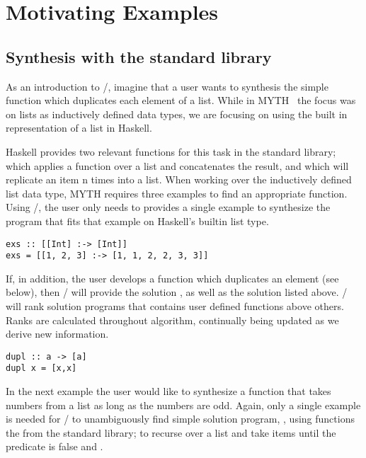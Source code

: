 \section{Motivating Examples} 
\label{examples}

\subsection{Synthesis with the standard library}

As an introduction to \ourTool/, imagine that a user wants to synthesis the simple  \cite{Osera:2015} function which duplicates each element of a list. While in MYTH~\cite{Osera:2015} the focus was on lists as inductively defined data types, we are focusing on using the built in representation of a list in Haskell.

Haskell provides two relevant functions for this task in the standard library;  which applies a function over a list and concatenates the result, and  which will replicate an item n times into a list. When working over the inductively defined list data type, MYTH requires three examples to find an appropriate function. Using \ourTool/, the user only needs to provides a single example to synthesize the program  that fits that example on Haskell's builtin list type.

\begin{lstlisting}
exs :: [[Int] :-> [Int]]
exs = [[1, 2, 3] :-> [1, 1, 2, 2, 3, 3]]
\end{lstlisting}

If, in addition, the user develops a function  which duplicates an element (see below), then \ourTool/ will provide the solution , as well as the solution listed above. \ourTool/ will rank solution programs that contains user defined functions above others. Ranks are calculated throughout algorithm, continually being updated as we derive new information.

\begin{lstlisting}
dupl :: a -> [a]
dupl x = [x,x]
\end{lstlisting}

In the next example the user would like to synthesize a function that takes numbers from a list as long as the numbers are odd.
Again, only a single example is needed for \ourTool/ to unambiguously find  simple solution program, , using functions the from the standard library;  to recurse over a list and take items until the predicate is false and . 

